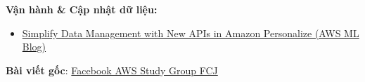 \vspace{0.5em}\noindent\textbf{Vận hành \& Cập nhật dữ
liệu:}\par

\begin{itemize}
\tightlist
\item
  \href{https://aws.amazon.com/blogs/machine-learning/simplify-data-management-with-new-apis-in-amazon-personalize}{Simplify
  Data Management with New APIs in Amazon Personalize (AWS ML Blog)}
\end{itemize}

\textbf{Bài viết gốc}:
\href{https://www.facebook.com/groups/awsstudygroupfcj/permalink/2229289067836053/?rdid=PGigWM6loaBLr4ZG\#}{Facebook
AWS Study Group FCJ}
